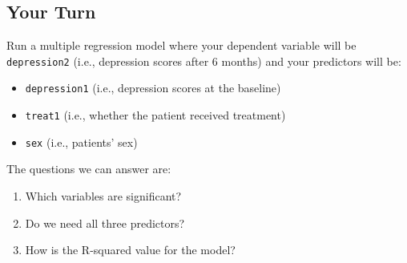 \documentclass[]{book}
\providecommand{\tightlist}{%
  \setlength{\itemsep}{0pt}\setlength{\parskip}{0pt}}
\begin{document}
\hypertarget{your-turn-9}{%
\subsection{Your Turn}\label{your-turn-9}}

Run a multiple regression model where your dependent variable will be \texttt{depression2} (i.e., depression scores after 6 months) and your predictors will be:

\begin{itemize}
\tightlist
\item
  \texttt{depression1} (i.e., depression scores at the baseline)
\item
  \texttt{treat1} (i.e., whether the patient received treatment)
\item
  \texttt{sex} (i.e., patients' sex)
\end{itemize}

The questions we can answer are:

\begin{enumerate}
\def\labelenumi{\arabic{enumi}.}
\tightlist
\item
  Which variables are significant?
\item
  Do we need all three predictors?
\item
  How is the R-squared value for the model?
\end{enumerate}


\end{document}
